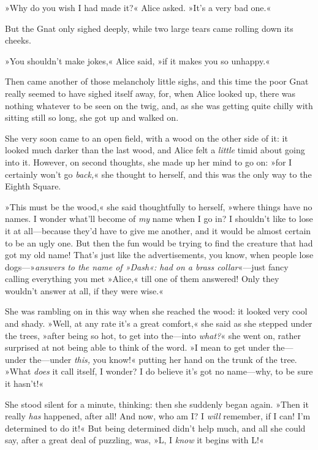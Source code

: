 »Why do you wish I had made it?« Alice asked. »It's a very bad one.«

But the Gnat only sighed deeply, while two large tears came rolling down its cheeks.

»You shouldn't make jokes,« Alice said, »if it makes you so unhappy.«

Then came another of those melancholy little sighs, and this time the poor Gnat really seemed to have sighed itself away, for, when Alice looked up, there was nothing whatever to be seen on the twig, and, as she was getting quite chilly with sitting still so long, she got up and walked on.

She very soon came to an open field, with a wood on the other side of it: it looked much darker than the last wood, and Alice felt a \textit{little} timid about going into it. However, on second thoughts, she made up her mind to go on: »for I certainly won't go \textit{back,}« she thought to herself, and this was the only way to the Eighth Square.

»This must be the wood,« she said thoughtfully to herself, »where things have no names. I wonder what'll become of \textit{my} name when I go in? I shouldn't like to lose it at all—because they'd have to give me another, and it would be almost certain to be an ugly one. But then the fun would be trying to find the creature that had got my old name! That's just like the advertisements, you know, when people lose dogs—»\textit{answers to the name of »Dash«: had on a brass collar}«—just fancy calling everything you met »Alice,« till one of them answered! Only they wouldn't answer at all, if they were wise.«

She was rambling on in this way when she reached the wood: it looked very cool and shady. »Well, at any rate it's a great comfort,« she said as she stepped under the trees, »after being so hot, to get into the—into \textit{what?}« she went on, rather surprised at not being able to think of the word. »I mean to get under the—under the—under \textit{this,} you know!« putting her hand on the trunk of the tree. »What \textit{does} it call itself, I wonder? I do believe it's got no name—why, to be sure it hasn't!«

She stood silent for a minute, thinking: then she suddenly began again. »Then it really \textit{has} happened, after all! And now, who am I? I \textit{will} remember, if I can! I'm determined to do it!« But being determined didn't help much, and all she could say, after a great deal of puzzling, was, »L, I \textit{know} it begins with L!«

